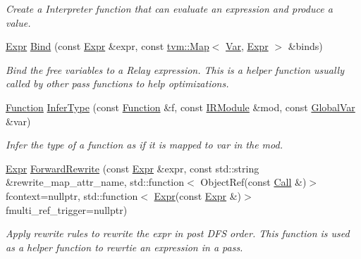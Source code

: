 \begin{DoxyCompactItemize}
\begin{DoxyCompactList}\small\item\em Create a Interpreter function that can evaluate an expression and produce a value. \end{DoxyCompactList}\item 
\hyperlink{namespacetvm_1_1relay_a5b84e3790f89bb3fad5c7911eeb99531}{Expr} \hyperlink{namespacetvm_1_1relay_ad7cfa0b6a4537989b886d47767526726}{Bind} (const \hyperlink{namespacetvm_1_1relay_a5b84e3790f89bb3fad5c7911eeb99531}{Expr} \&expr, const \hyperlink{classtvm_1_1Map}{tvm\+::\+Map}$<$ \hyperlink{classtvm_1_1relay_1_1Var}{Var}, \hyperlink{namespacetvm_1_1relay_a5b84e3790f89bb3fad5c7911eeb99531}{Expr} $>$ \&binds)
\begin{DoxyCompactList}\small\item\em Bind the free variables to a Relay expression. This is a helper function usually called by other pass functions to help optimizations. \end{DoxyCompactList}\item 
\hyperlink{classtvm_1_1relay_1_1Function}{Function} \hyperlink{namespacetvm_1_1relay_a18141658f627685d55704609111f57be}{Infer\+Type} (const \hyperlink{classtvm_1_1relay_1_1Function}{Function} \&f, const \hyperlink{classtvm_1_1IRModule}{I\+R\+Module} \&mod, const \hyperlink{namespacetvm_1_1relay_a81ac7c3d0824529fddce7849c9c66289}{Global\+Var} \&var)
\begin{DoxyCompactList}\small\item\em Infer the type of a function as if it is mapped to var in the mod. \end{DoxyCompactList}\item 
\hyperlink{namespacetvm_1_1relay_a5b84e3790f89bb3fad5c7911eeb99531}{Expr} \hyperlink{namespacetvm_1_1relay_ac36059b06a538598a8f46257c0cb9fe0}{Forward\+Rewrite} (const \hyperlink{namespacetvm_1_1relay_a5b84e3790f89bb3fad5c7911eeb99531}{Expr} \&expr, const std\+::string \&rewrite\+\_\+map\+\_\+attr\+\_\+name, std\+::function$<$ Object\+Ref(const \hyperlink{classtvm_1_1relay_1_1Call}{Call} \&)$>$ fcontext=nullptr, std\+::function$<$ \hyperlink{namespacetvm_1_1relay_a5b84e3790f89bb3fad5c7911eeb99531}{Expr}(const \hyperlink{namespacetvm_1_1relay_a5b84e3790f89bb3fad5c7911eeb99531}{Expr} \&)$>$ fmulti\+\_\+ref\+\_\+trigger=nullptr)
\begin{DoxyCompactList}\small\item\em Apply rewrite rules to rewrite the expr in post D\+FS order. This function is used as a helper function to rewrtie an expression in a pass. \end{DoxyCompactList}\item 

\end{DoxyCompactItemize}
